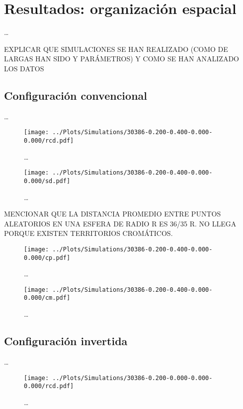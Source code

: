 \chapter{Resultados: organización espacial}
\label{cap:results}

\dots

EXPLICAR QUE SIMULACIONES SE HAN REALIZADO (COMO DE LARGAS HAN SIDO Y PARÁMETROS) Y COMO SE HAN ANALIZADO LOS DATOS

\section{Configuración convencional}

\dots

\begin{figure}
    \centering
    \texttt{[image: ../Plots/Simulations/30386-0.200-0.400-0.000-0.000/rcd.pdf]}
    \caption{\dots}
    \label{fig:rcd_c}
\end{figure}

\begin{figure}
    \centering
    \texttt{[image: ../Plots/Simulations/30386-0.200-0.400-0.000-0.000/sd.pdf]}
    \caption{\dots}
    \label{fig:sd_c}
\end{figure}

MENCIONAR QUE LA DISTANCIA PROMEDIO ENTRE PUNTOS ALEATORIOS EN UNA ESFERA DE RADIO R ES 36/35 R. NO LLEGA PORQUE EXISTEN TERRITORIOS CROMÁTICOS.

\begin{figure}
    \centering
    \texttt{[image: ../Plots/Simulations/30386-0.200-0.400-0.000-0.000/cp.pdf]}
    \caption{\dots}
    \label{fig:cp_c}
\end{figure}

\begin{figure}
    \centering
    \texttt{[image: ../Plots/Simulations/30386-0.200-0.400-0.000-0.000/cm.pdf]}
    \caption{\dots}
    \label{fig:cm_c}
\end{figure}

\section{Configuración invertida}

\dots

\begin{figure}
    \centering
    \texttt{[image: ../Plots/Simulations/30386-0.200-0.000-0.000-0.000/rcd.pdf]}
    \caption{\dots}
    \label{fig:rcd_i}
\end{figure}

